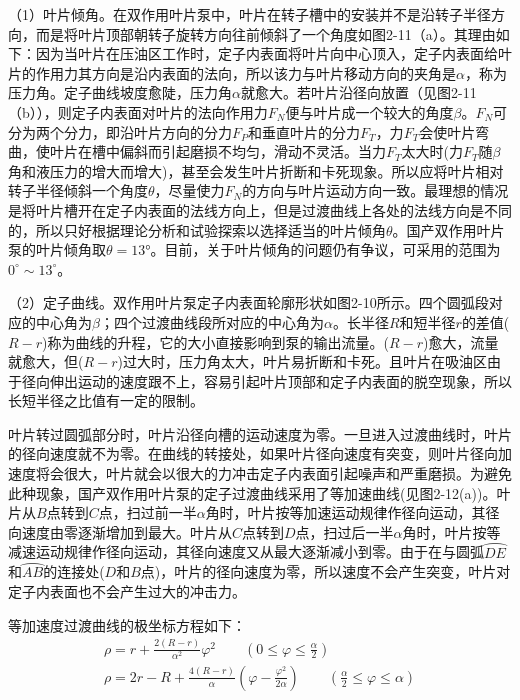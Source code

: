 （1）叶片倾角。在双作用叶片泵中，叶片在转子槽中的安装并不是沿转子半径方向，而是将叶片顶部朝转子旋转方向往前倾斜了一个角度如图2-11（a）。其理由如下：因为当叶片在压油区工作时，定子内表面将叶片向中心顶入，定子内表面给叶片的作用力其方向是沿内表面的法向，所以该力与叶片移动方向的夹角是$\alpha$，称为压力角。定子曲线坡度愈陡，压力角$\alpha$就愈大。若叶片沿径向放置（见图2-11（b）），则定子内表面对叶片的法向作用力$F_N$便与叶片成一个较大的角度$\beta$。$F_N$可分为两个分力，即沿叶片方向的分力$F_P$和垂直叶片的分力$F_T$，力$F_T$会使叶片弯曲，使叶片在槽中偏斜而引起磨损不均匀，滑动不灵活。当力$F_T$太大时(力$F_T$随$\beta$角和液压力的增大而增大)，甚至会发生叶片折断和卡死现象。所以应将叶片相对转子半径倾斜一个角度$\theta$，尽量使力$F_N$的方向与叶片运动方向一致。最理想的情况是将叶片槽开在定子内表面的法线方向上，但是过渡曲线上各处的法线方向是不同的，所以只好根据理论分析和试验探索以选择适当的叶片倾角$\theta$。国产双作用叶片泵的叶片倾角取$\theta=13°$。目前，关于叶片倾角的问题仍有争议，可采用的范围为$0^{\circ}\sim 13^{\circ}$。
\par （2）定子曲线。双作用叶片泵定子内表面轮廓形状如图2-10所示。四个圆弧段对应的中心角为$\beta$；四个过渡曲线段所对应的中心角为$\alpha$。长半径$R$和短半径$r$的差值($R-r$)称为曲线的升程，它的大小直接影响到泵的输出流量。($R-r$)愈大，流量就愈大，但($R-r$)过大时，压力角太大，叶片易折断和卡死。且叶片在吸油区由于径向伸出运动的速度跟不上，容易引起叶片顶部和定子内表面的脱空现象，所以长短半径之比值有一定的限制。
\par 叶片转过圆弧部分时，叶片沿径向槽的运动速度为零。一旦进入过渡曲线时，叶片的径向速度就不为零。在曲线的转接处，如果叶片径向速度有突变，则叶片径向加速度将会很大，叶片就会以很大的力冲击定子内表面引起噪声和严重磨损。为避免此种现象，国产双作用叶片泵的定子过渡曲线采用了等加速曲线(见图2-12(a))。叶片从$B$点转到$C$点，扫过前一半$\alpha$角时，叶片按等加速运动规律作径向运动，其径向速度由零逐渐增加到最大。叶片从$C$点转到$D$点，扫过后一半$\alpha$角时，叶片按等减速运动规律作径向运动，其径向速度又从最大逐渐减小到零。由于在与圆弧$\wideparen{DE}$和$\wideparen{AB}$的连接处($D$和$B$点)，叶片的径向速度为零，所以速度不会产生突变，叶片对定子内表面也不会产生过大的冲击力。
\par 等加速度过渡曲线的极坐标方程如下：
\begin{gather}
\rho =r+\frac{2(R-r)}{\alpha ^2} \varphi ^2 \qquad (0\leqslant \varphi \leqslant \frac{\alpha }{2} ) \\
\rho =2r-R+\frac{4(R-r)}{\alpha } (\varphi -\frac{\varphi ^2}{2\alpha } ) \qquad (\frac{\alpha }{2} \leqslant \varphi \leqslant \alpha  )
\end{gather}
